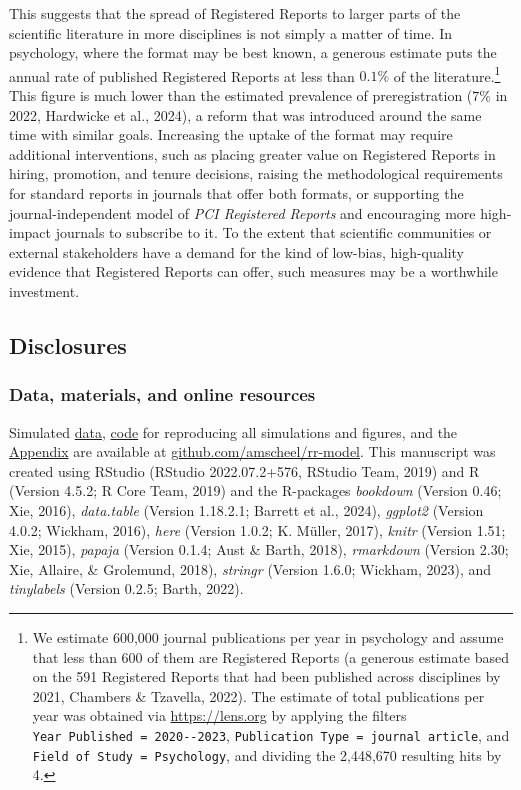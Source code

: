 \documentclass[
  british,
  a4paper,
  ,man,mask,floatsintext]{apa6}
\begin{document}
This suggests that the spread of Registered Reports to larger parts of the scientific literature in more disciplines is not simply a matter of time.
In psychology, where the format may be best known, a generous estimate puts the annual rate of published Registered Reports at less than \(0.1\%\) of the literature.\footnote{We estimate 600,000 journal publications per year in psychology and assume that less than 600 of them are Registered Reports (a generous estimate based on the 591 Registered Reports that had been published across disciplines by 2021, Chambers \& Tzavella, 2022). The estimate of total publications per year was obtained via \url{https://lens.org} by applying the filters \texttt{Year\ Published\ =\ 2020-\/-2023}, \texttt{Publication\ Type\ =\ journal\ article}, and \texttt{Field\ of\ Study\ =\ Psychology}, and dividing the 2,448,670 resulting hits by 4.}
This figure is much lower than the estimated prevalence of preregistration (\(7\%\) in 2022, Hardwicke et al., 2024), a reform that was introduced around the same time with similar goals.
Increasing the uptake of the format may require additional interventions, such as placing greater value on Registered Reports in hiring, promotion, and tenure decisions, raising the methodological requirements for standard reports in journals that offer both formats, or supporting the journal-independent model of \emph{PCI Registered Reports} and encouraging more high-impact journals to subscribe to it.
To the extent that scientific communities or external stakeholders have a demand for the kind of low-bias, high-quality evidence that Registered Reports can offer, such measures may be a worthwhile investment.

\subsection{Disclosures}\label{disclosures}

\subsubsection{Data, materials, and online resources}\label{data-materials-and-online-resources}

Simulated \href{https://github.com/amscheel/rr-model/tree/master/data}{data}, \href{https://github.com/amscheel/rr-model/tree/master/code}{code} for reproducing all simulations and figures, and the \href{https://github.com/amscheel/rr-model/blob/master/appendix/rr-risk-sensitivity_appendix.pdf}{Appendix} are available at \href{https://github.com/amscheel/rr-model}{github.com/amscheel/rr-model}.
This manuscript was created using RStudio (RStudio 2022.07.2+576, RStudio Team, 2019) and R (Version 4.5.2; R Core Team, 2019) and the R-packages \emph{bookdown} (Version 0.46; Xie, 2016), \emph{data.table} (Version 1.18.2.1; Barrett et al., 2024), \emph{ggplot2} (Version 4.0.2; Wickham, 2016), \emph{here} (Version 1.0.2; K. Müller, 2017), \emph{knitr} (Version 1.51; Xie, 2015), \emph{papaja} (Version 0.1.4; Aust \& Barth, 2018), \emph{rmarkdown} (Version 2.30; Xie, Allaire, \& Grolemund, 2018), \emph{stringr} (Version 1.6.0; Wickham, 2023), and \emph{tinylabels} (Version 0.2.5; Barth, 2022).
\end{document}

